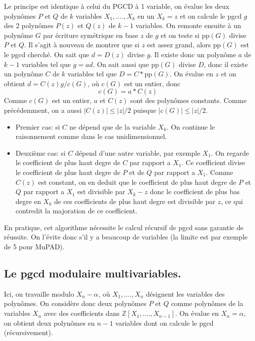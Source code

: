 \documentclass[a4paper,11pt]{book}
\begin{document}
\begin{giacjshere}
Le principe est identique à celui du PGCD à 1 variable, on évalue les deux
polynômes $P$ et $Q$ de $k$ variables $X_1, \ldots ., X_k$ en un $X_k = z$ et
on calcule le pgcd $g$ des 2 polynômes $P ( z )$ et $Q ( z )$ de $k - 1$
variables. On remonte ensuite à un polynôme $G$ par écriture symétrique en
base $z$ de $g$ et on teste si $\mbox{pp} ( G )$ divise $P$ et $Q$. Il s'agit
à nouveau de montrer que si $z$ est assez grand, alors $\mbox{pp} ( G )$ est
le pgcd cherché. On sait que $d = D ( z )$ divise $g$. Il existe donc un
polynôme $a$ de $k - 1$ variables tel que $g = a d$. On sait aussi que
$\mbox{pp} ( G )$ divise $D$, donc il existe un polynôme $C$ de $k$ variables
tel que $D = C \ast \mbox{pp} ( G ) .$ On évalue en $z$ et on obtient $d = C (
z ) g / c ( G )$, où $c ( G )$ est un entier, donc
\[ c ( G ) = a \ast C ( z ) \]
Comme $c ( G )$ est un entier, $a$ et $C ( z )$ sont des polynômes constants.
Comme précédemment, on a aussi $| C ( z ) | \leq | z | / 2$ puisque $| c
( G ) | \leq | z | / 2$.
\begin{itemize}
  \item Premier cas: si $C$ ne dépend que de la variable $X_k$. On continue le
  raisonnement comme dans le cas unidimensionnel.
  
  \item Deuxième cas: si $C$ dépend d'une autre variable, par exemple $X_1$.
  On regarde le coefficient de plus haut degre de $C$ par rapport a $X_1$. Ce
  coefficient divise le coefficient de plus haut degre de $P$ et de $Q$ par
  rapport a $X_1$. Comme $C ( z )$ est constant, on en deduit que le
  coefficient de plus haut degre de $P$ et $Q$ par rapport a $X_1$ est
  divisible par $X_k - z$ donc le coefficient de plus bas degre en $X_k$ de
  ces coefficients de plus haut degre est divisible par $z$, ce qui contredit
  la majoration de ce coefficient.
\end{itemize}


En pratique, cet algorithme nécessite le calcul récursif de pgcd sans
garantie de réussite. On l'évite donc s'il y a beaucoup de variables (la
limite est par exemple de 5 pour MuPAD).

\subsection{Le pgcd modulaire multivariables.}

Ici, on travaille modulo $X_n - \alpha_{}$, où $X_1, \ldots ., X_n$ désignent
les variables des polynômes. On considère donc deux polynômes $P$ et $Q$ comme
polynômes de la variables $X_n$ avec des coefficients dans $\mathbb{Z} [ X_1,
\ldots ., X_{n - 1} ]$. On évalue en $X_n = \alpha$, on obtient deux polynômes
en $n - 1$ variables dont on calcule le pgcd (récursivement).


\end{giacjshere}
\end{document}
